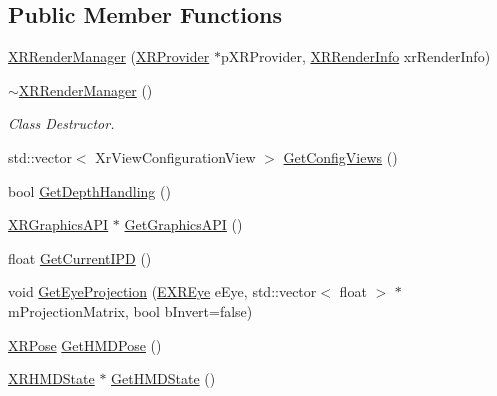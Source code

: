 \subsection*{Public Member Functions}
\begin{DoxyCompactItemize}
\item 
\mbox{\hyperlink{class_open_x_r_provider_1_1_x_r_render_manager_a8ffc871639334f7e2cebfe41f2340b42}{X\+R\+Render\+Manager}} (\mbox{\hyperlink{class_open_x_r_provider_1_1_x_r_provider}{X\+R\+Provider}} $\ast$p\+X\+R\+Provider, \mbox{\hyperlink{struct_open_x_r_provider_1_1_x_r_render_info}{X\+R\+Render\+Info}} xr\+Render\+Info)
\item 
\mbox{\hyperlink{class_open_x_r_provider_1_1_x_r_render_manager_a876800efe7e4a85a4aa291db72fae4ee}{$\sim$\+X\+R\+Render\+Manager}} ()
\begin{DoxyCompactList}\small\item\em Class Destructor. \end{DoxyCompactList}\item 
std\+::vector$<$ Xr\+View\+Configuration\+View $>$ \mbox{\hyperlink{class_open_x_r_provider_1_1_x_r_render_manager_a41bf28f97e9ce4cdae0e8bff1f35a670}{Get\+Config\+Views}} ()
\item 
bool \mbox{\hyperlink{class_open_x_r_provider_1_1_x_r_render_manager_af9c80d37753ba2ae24fe2f1aca91ebd0}{Get\+Depth\+Handling}} ()
\item 
\mbox{\hyperlink{class_open_x_r_provider_1_1_x_r_graphics_a_p_i}{X\+R\+Graphics\+A\+PI}} $\ast$ \mbox{\hyperlink{class_open_x_r_provider_1_1_x_r_render_manager_a7484db5238c64c870c189c8db3403b83}{Get\+Graphics\+A\+PI}} ()
\item 
float \mbox{\hyperlink{class_open_x_r_provider_1_1_x_r_render_manager_abcef1310df0483107fbbb00dd41ff546}{Get\+Current\+I\+PD}} ()
\item 
void \mbox{\hyperlink{class_open_x_r_provider_1_1_x_r_render_manager_ac0960870b34b29fe479feb4ae389abdf}{Get\+Eye\+Projection}} (\mbox{\hyperlink{namespace_open_x_r_provider_a8aa379869e30772896e6c468eb54f155}{E\+X\+R\+Eye}} e\+Eye, std\+::vector$<$ float $>$ $\ast$m\+Projection\+Matrix, bool b\+Invert=false)
\item 
\mbox{\hyperlink{struct_open_x_r_provider_1_1_x_r_pose}{X\+R\+Pose}} \mbox{\hyperlink{class_open_x_r_provider_1_1_x_r_render_manager_a02a943efc18f105316b86a669d20ef2e}{Get\+H\+M\+D\+Pose}} ()
\item 
\mbox{\hyperlink{struct_open_x_r_provider_1_1_x_r_h_m_d_state}{X\+R\+H\+M\+D\+State}} $\ast$ \mbox{\hyperlink{class_open_x_r_provider_1_1_x_r_render_manager_af6289267e9bf20f6e4d65e4051dd9944}{Get\+H\+M\+D\+State}} ()

\end{DoxyCompactItemize}
